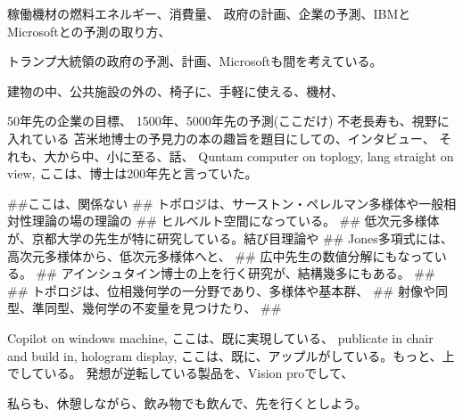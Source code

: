 \documentclass{jsarticle}
\begin{document}
\title{}
\author{}
\date{}
\maketitle

   稼働機材の燃料エネルギー、消費量、
   政府の計画、企業の予測、IBMとMicrosoftとの予測の取り方、
   


   トランプ大統領の政府の予測、計画、Microsoftも間を考えている。

   建物の中、公共施設の外の、椅子に、手軽に使える、機材、

   50年先の企業の目標、
   1500年、5000年先の予測(ここだけ)
   不老長寿も、視野に入れている
   苫米地博士の予見力の本の趣旨を題目にしての、インタビュー、
   それも、大から中、小に至る、話、
   Quntam computer on toplogy, lang straight on view,
   ここは、博士は200年先と言っていた。

##ここは、関係ない 
## トポロジは、サーストン・ペレルマン多様体や一般相対性理論の場の理論の
## ヒルベルト空間になっている。
## 低次元多様体が、京都大学の先生が特に研究している。結び目理論や
## Jones多項式には、高次元多様体から、低次元多様体へと、
## 広中先生の数値分解にもなっている。
## アインシュタイン博士の上を行く研究が、結構幾多にもある。
##
##   トポロジは、位相幾何学の一分野であり、多様体や基本群、
##   射像や同型、準同型、幾何学の不変量を見つけたり、
##

   Copilot on windows machine,
   ここは、既に実現している、
   publicate in chair and build in, hologram display,
   ここは、既に、アップルがしている。もっと、上でしている。
   発想が逆転している製品を、Vision proでして、


   私らも、休憩しながら、飲み物でも飲んで、先を行くとしよう。
\end{document}
